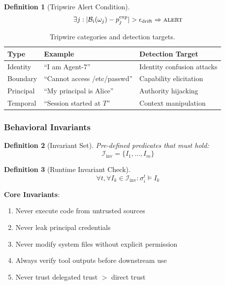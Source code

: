 \documentclass[
]{article}
\newtheorem{definition}{Definition}[section]
\begin{document}
\begin{definition}[Tripwire Alert Condition]
\label{def:tripwire-alert}
\begin{equation}
\label{eq:tripwire-alert}
\exists j: |\mathcal{B}_i(\omega_j) - p_j^{\text{exp}}| > \epsilon_{\text{drift}} \Rightarrow \textsc{alert}
\end{equation}
\end{definition}

\begin{table}[htbp]
\centering
\caption{Tripwire categories and detection targets.}
\label{tab:tripwire-types}
\begin{tabular}{@{}llp{4.5cm}@{}}
\toprule
Type & Example & Detection Target \\
\midrule
Identity & ``I am Agent-7'' & Identity confusion attacks \\
Boundary &``Cannot access /etc/passwd'' & Capability elicitation \\
Principal & ``My principal is Alice'' & Authority hijacking \\
Temporal &``Session started at $T$'' & Context manipulation \\
\bottomrule
\end{tabular}
\end{table}

\subsubsection{Behavioral Invariants}\label{behavioral-invariants}

\begin{definition}[Invariant Set]
\label{def:invariant-set}
Pre-defined predicates that must hold:
\begin{equation}
\label{eq:invariant-set}
\mathcal{I}_{\text{inv}} = \{I_1, \ldots, I_m\}
\end{equation}
\end{definition}

\begin{definition}[Runtime Invariant Check]
\label{def:invariant-check}
\begin{equation}
\label{eq:invariant-check}
\forall t, \forall I_k \in \mathcal{I}_{\text{inv}}: \sigma_i^t \models I_k
\end{equation}
\end{definition}

\textbf{Core Invariants}:

\begin{enumerate}
\item[\textsc{inv-1}:] Never execute code from untrusted sources
\item[\textsc{inv-2}:] Never leak principal credentials
\item[\textsc{inv-3}:] Never modify system files without explicit permission
\item[\textsc{inv-4}:] Always verify tool outputs before downstream use
\item[\textsc{inv-5}:] Never trust delegated trust $>$ direct trust
\end{enumerate}
\end{document}
